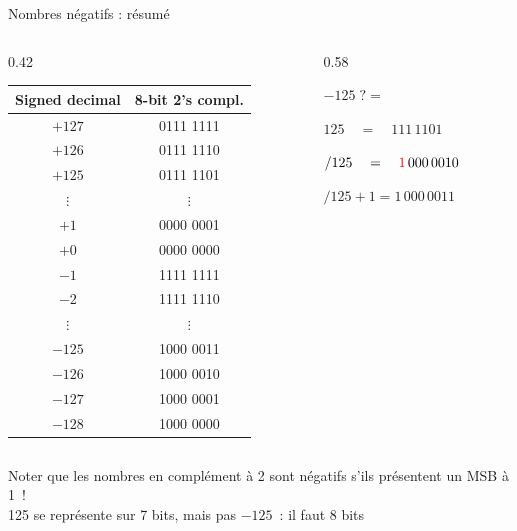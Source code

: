 \begin{frame}{Nombres négatifs : résumé}
  \begin{columns}[t]
    \begin{column}{0.42\textwidth}
      \tiny
      \renewcommand{\arraystretch}{1.05}
      \begin{tabular}{|c|c|}
        \hline
        \textbf{Signed decimal} & \textbf{8-bit 2's compl.} \\
        \hline
        $+127$ & 0111 1111 \\
        $+126$ & 0111 1110 \\
        $+125$ & 0111 1101 \\
        $\vdots$ & $\vdots$ \\
        $+1$ & 0000 0001 \\
        $+0$ & 0000 0000 \\
        \hline
        $-1$ & 1111 1111 \\
        $-2$ & 1111 1110 \\
        $\vdots$ & $\vdots$ \\
        $-125$ & 1000 0011 \\
        $-126$ & 1000 0010 \\
        $-127$ & 1000 0001 \\
        $-128$ & 1000 0000 \\
        \hline
      \end{tabular}
    \end{column}
    \begin{column}{0.58\textwidth}
      \small
      \begin{center}
      \end{center}

      \bigskip
      \colorbox{orange!40}{
      \begin{minipage}{0.95\textwidth}
        $-125\; ? =$

        \medskip
        $125 \quad = \quad 111\,1101$

        \medskip
        $/125 \quad = \quad \textcolor{red}{1}\,000\,0010$

        \medskip
        $/125+1 = 1\,000\,0011$
      \end{minipage}}
    \end{column}
  \end{columns}

  \bigskip
  \small
  Noter que les nombres en complément à 2 sont négatifs s'ils présentent un
  MSB à 1~!\\
  125 se représente sur 7 bits, mais pas $-125$~: il faut 8 bits
\end{frame}

